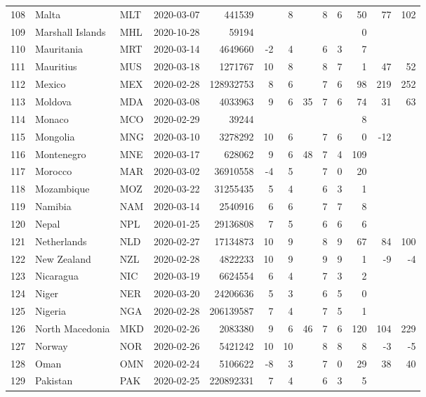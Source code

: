 \begin{longtable}{rlllrrrrrrrrr}
  108 & Malta & MLT & 2020-03-07 & 441539 &  & 8 &  & 8 & 6 & 50 & 77 & 102 \\ 
  109 & Marshall Islands & MHL & 2020-10-28 & 59194 &  &  &  &  &  & 0 &  &  \\ 
  110 & Mauritania & MRT & 2020-03-14 & 4649660 & -2 & 4 &  & 6 & 3 & 7 &  &  \\ 
  111 & Mauritius & MUS & 2020-03-18 & 1271767 & 10 & 8 &  & 8 & 7 & 1 & 47 & 52 \\ 
  112 & Mexico & MEX & 2020-02-28 & 128932753 & 8 & 6 &  & 7 & 6 & 98 & 219 & 252 \\ 
  113 & Moldova & MDA & 2020-03-08 & 4033963 & 9 & 6 & 35 & 7 & 6 & 74 & 31 & 63 \\ 
  114 & Monaco & MCO & 2020-02-29 & 39244 &  &  &  &  &  & 8 &  &  \\ 
  115 & Mongolia & MNG & 2020-03-10 & 3278292 & 10 & 6 &  & 7 & 6 & 0 & -12 &  \\ 
  116 & Montenegro & MNE & 2020-03-17 & 628062 & 9 & 6 & 48 & 7 & 4 & 109 &  &  \\ 
  117 & Morocco & MAR & 2020-03-02 & 36910558 & -4 & 5 &  & 7 & 0 & 20 &  &  \\ 
  118 & Mozambique & MOZ & 2020-03-22 & 31255435 & 5 & 4 &  & 6 & 3 & 1 &  &  \\ 
  119 & Namibia & NAM & 2020-03-14 & 2540916 & 6 & 6 &  & 7 & 7 & 8 &  &  \\ 
  120 & Nepal & NPL & 2020-01-25 & 29136808 & 7 & 5 &  & 6 & 6 & 6 &  &  \\ 
  121 & Netherlands & NLD & 2020-02-27 & 17134873 & 10 & 9 &  & 8 & 9 & 67 & 84 & 100 \\ 
  122 & New Zealand & NZL & 2020-02-28 & 4822233 & 10 & 9 &  & 9 & 9 & 1 & -9 & -4 \\ 
  123 & Nicaragua & NIC & 2020-03-19 & 6624554 & 6 & 4 &  & 7 & 3 & 2 &  &  \\ 
  124 & Niger & NER & 2020-03-20 & 24206636 & 5 & 3 &  & 6 & 5 & 0 &  &  \\ 
  125 & Nigeria & NGA & 2020-02-28 & 206139587 & 7 & 4 &  & 7 & 5 & 1 &  &  \\ 
  126 & North Macedonia & MKD & 2020-02-26 & 2083380 & 9 & 6 & 46 & 7 & 6 & 120 & 104 & 229 \\ 
  127 & Norway & NOR & 2020-02-26 & 5421242 & 10 & 10 &  & 8 & 8 & 8 & -3 & -5 \\ 
  128 & Oman & OMN & 2020-02-24 & 5106622 & -8 & 3 &  & 7 & 0 & 29 & 38 & 40 \\ 
  129 & Pakistan & PAK & 2020-02-25 & 220892331 & 7 & 4 &  & 6 & 3 & 5 &  &  \\ 

\end{longtable}
